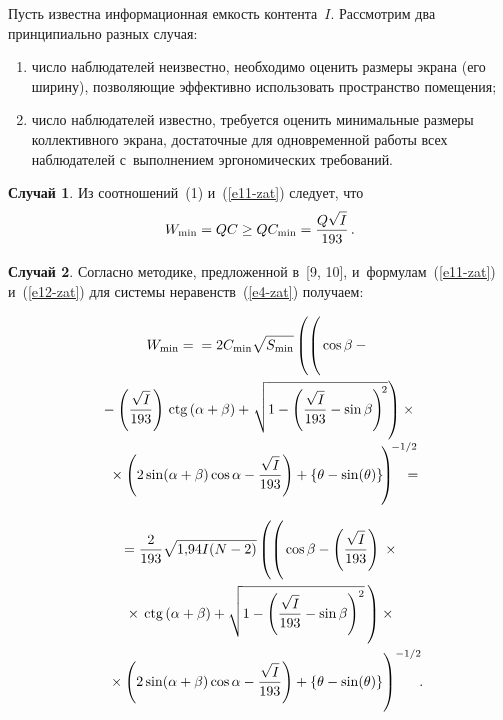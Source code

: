 \begin{multicols}{2}
     Пусть известна информационная емкость контента~$I$. Рассмотрим два
принципиально разных случая:
     \begin{enumerate}[(1)]
\item число наблюдателей неизвестно, необходимо оценить размеры экрана
(его ширину), позволяющие эффективно использовать пространство
помещения;\\[-13pt]
\item число наблюдателей известно, требуется оценить минимальные
размеры коллективного экрана, достаточные для одновременной работы
всех наблюдателей с~выполнением эргономических требований.
\end{enumerate}

\noindent
\textbf{Случай 1}. Из соотношений~(1) и~(\ref{e11-zat}) следует, что
\begin{equation*}
W_{\min} =QC\geq QC_{\min}=\displaystyle\frac{\displaystyle Q\sqrt{I}\mathstrut}{\displaystyle 193\mathstrut}\,.
\end{equation*}

\smallskip

\noindent
\textbf{Случай 2}. Согласно методике, предложенной в~[9, 10],
и~формулам~(\ref{e11-zat}) и~(\ref{e12-zat}) для системы
неравенств~(\ref{e4-zat}) получаем:

\vspace*{-2pt}

\noindent
\begin{multline*}
W_{\min} =
{}=2C_{\min} \sqrt{S_{\min}}
\left(
\left(
\vphantom{\sqrt{1-\left(\fr{\sqrt{I}}{193} -\sin\beta\right)^2}}
\cos\beta -{}\right.\right.\\
{}-\left(\fr{\sqrt{I}}{193}\right)\ctg
(\alpha+\beta) +\!
\left.\left.\sqrt{1-\left(\fr{\sqrt{I}}{193} -\sin\beta\right)^{\!2}}
\right) \times{}\right.\\[-2pt]
\left.{}\times
\left(2\sin(\alpha+\beta)\cos\alpha -
\fr{\sqrt{I}}{193}\right)+\{\theta -\sin(\theta)\}
\vphantom{\sqrt{1-\left(\fr{\sqrt{I}}{193} -\sin\beta\right)^2}}
\!\right)^{\!-1/2}\!\!\!\! \!\!={}\hspace*{-7pt}
\end{multline*}

\noindent
\begin{multline*}
{}=
\fr{2}{193}\sqrt{1{,}94I(N-2)} \left(
\left(
\vphantom{\sqrt{1-\left(\fr{\sqrt{I}}{193} -\sin\beta\right)^2}}
\cos\beta - \left(\fr{\sqrt{I}}{193}\right)\right.\right.\times{}\\
\left.\left.{}\times\ctg (\alpha+\beta)+
\sqrt{1-\left(\fr{\sqrt{I}}{193}-\sin\beta\right)^2}\,\right) \times{}\right.\\
\left.{}\times
\left(2\sin (\alpha+\beta)\cos\alpha -
\fr{\sqrt{I}}{193}\right)+\{\theta -\sin(\theta)\}
\vphantom{\sqrt{1-\left(\fr{\sqrt{I}}{193} -\sin\beta\right)^2}}
\right)^{-1/2}\!\!.\hspace*{-7.20935pt}
\end{multline*}


\end{multicols}
